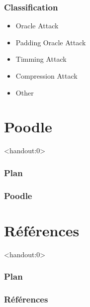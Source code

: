 \begin{frame}[fragile]
  \frametitle{Classification }

  \begin{itemize}
  \item Oracle Attack
  \item Padding Oracle Attack
  \item Timming Attack
  \item Compression Attack
  \item Other
  \end{itemize}
\end{frame}


\section{Poodle}

\begin{frame}<handout:0>
  \frametitle{Plan}
  \tableofcontents[currentsection]
\end{frame}

\begin{frame}
  \frametitle{Poodle}
  

\end{frame}


\section{Références}

\begin{frame}<handout:0>
  \frametitle{Plan}
  \tableofcontents[currentsection,subsectionstyle=hide]
\end{frame}

\nocite{*}


\begin{frame}[allowframebreaks]
  \frametitle{Références}
  
\end{frame}

\begin{frame}
  \vfill
  \centering
  \vfill
\end{frame}
